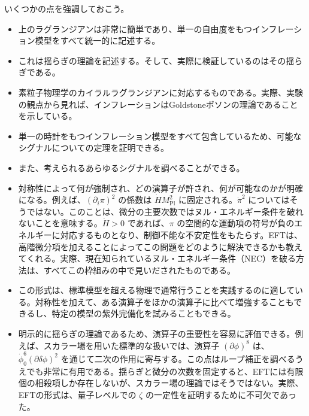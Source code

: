 いくつかの点を強調しておこう。
\begin{itemize}
\item 上のラグランジアンは非常に簡単であり、単一の自由度をもつインフレーション模型をすべて統一的に記述する。
\item これは揺らぎの理論を記述する。そして、実際に検証しているのはその揺らぎである。
\item 素粒子物理学のカイラルラグランジアンに対応するものである。実際、実験の観点から見れば、インフレーションはGoldstoneボソンの理論であることを示している。
\item 単一の時計をもつインフレーション模型をすべて包含しているため、可能なシグナルについての定理を証明できる。
\item また、考えられるあらゆるシグナルを調べることができる。
\item 対称性によって何が強制され、どの演算子が許され、何が可能なのかが明確になる。例えば、\((\partial_i\pi)^2\) の係数は \(\dot H M_{\mathrm{Pl}}^2\) に固定される。\(\dot\pi^2\) についてはそうではない。このことは、微分の主要次数ではヌル・エネルギー条件を破れないことを意味する。\(\dot H>0\) であれば、\(\pi\) の空間的な運動項の符号が負のエネルギーに対応するものとなり、制御不能な不安定性をもたらす。EFTは、高階微分項を加えることによってこの問題をどのように解決できるかも教えてくれる。実際、現在知られているヌル・エネルギー条件（NEC）を破る方法は、すべてこの枠組みの中で見いだされたものである。
\item この形式は、標準模型を超える物理で通常行うことを実践するのに適している。対称性を加えて、ある演算子をほかの演算子に比べて増強することもできるし、特定の模型の紫外完備化を試みることもできる。
\item 明示的に揺らぎの理論であるため、演算子の重要性を容易に評価できる。例えば、スカラー場を用いた標準的な扱いでは、演算子 \((\partial\phi)^8\) は、\(\dot\phi_0^6(\partial\delta\phi)^2\) を通じて二次の作用に寄与する。この点はループ補正を調べるうえでも非常に有用である。揺らぎと微分の次数を固定すると、EFTには有限個の相殺項しか存在しないが、スカラー場の理論ではそうではない。実際、EFTの形式は、量子レベルでの \(\zeta\) の一定性を証明するために不可欠であった\cite{Pimentel:2012tw,Senatore:2012ya}。
\end{itemize}
